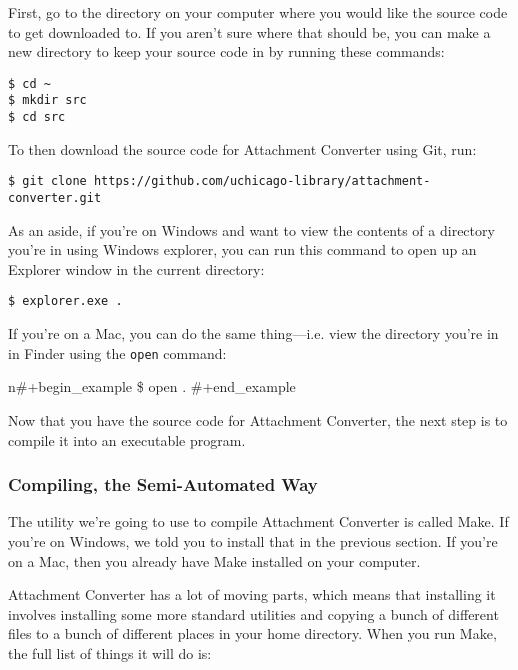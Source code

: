 \documentclass[11pt]{article}
\begin{document}
First, go to the directory on your computer where you would like the
source code to get downloaded to.  If you aren't sure where that
should be, you can make a new directory to keep your source code in by
running these commands:

\begin{verbatim}
$ cd ~
$ mkdir src
$ cd src
\end{verbatim}

To then download the source code for Attachment Converter using Git,
run:

\begin{verbatim}
$ git clone https://github.com/uchicago-library/attachment-converter.git
\end{verbatim}

As an aside, if you're on Windows and want to view the contents of a
directory you're in using Windows explorer, you can run this command
to open up an Explorer window in the current directory:

\begin{verbatim}
$ explorer.exe .
\end{verbatim}

If you're on a Mac, you can do the same thing---i.e. view the
directory you're in in Finder using the \texttt{open} command:

n\#+begin\_example
  \$ open .
\#+end\_example

Now that you have the source code for Attachment Converter, the next
step is to compile it into an executable program.

\subsubsection*{Compiling, the Semi-Automated Way}
\label{sec:orgd3112d0}

The utility we're going to use to compile Attachment Converter is
called Make.  If you're on Windows, we told you to install that in the
previous section.  If you're on a Mac, then you already have Make
installed on your computer.

Attachment Converter has a lot of moving parts, which means that
installing it involves installing some more standard utilities and
copying a bunch of different files to a bunch of different places in
your home directory.  When you run Make, the full list of things it
will do is:
\end{document}
